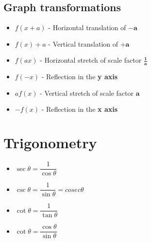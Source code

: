 \documentclass{article}[18pt]
\begin{document}
\subsection{Graph transformations}
\begin{itemize}
\item $f(x+a)$ - Horizontal translation of $\mathbf{-a}$
\item $f(x)+a$ - Vertical translation of $\mathbf{+a}$
\item $f(ax)$ - Horizontal stretch of scale factor $\mathbf{\frac{1}{a}}$
\item $f(-x)$ - Reflection in the \textbf{y axis}
\item $af(x)$ - Vertical stretch of scale factor $\mathbf{a}$
\item $-f(x)$ - Reflection in the \textbf{x axis}
\end{itemize}
\section{Trigonometry}
\begin{itemize}
\item $\sec\theta=\dfrac{1}{\cos\theta}$
\item $\csc\theta=\dfrac{1}{\sin\theta}=cosec\theta$
\item $\cot\theta=\dfrac{1}{\tan\theta}$
\item $\cot\theta=\dfrac{\cos\theta}{\sin\theta}$
\end{itemize}
\end{document}

